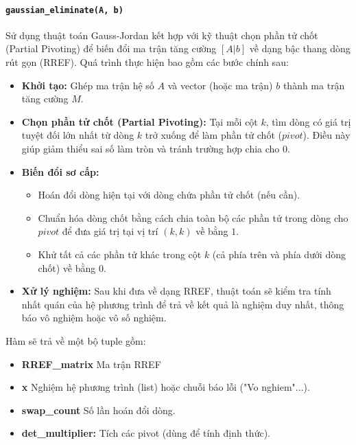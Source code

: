 \documentclass[12pt,a4paper]{article}
\begin{document}
\paragraph{\texttt{\textbf{gaussian\_eliminate(A, b)}}}
Sử dụng thuật toán Gauss-Jordan kết hợp với kỹ thuật chọn phần tử chốt (Partial Pivoting) để biến đổi ma trận tăng cường $[A | b]$ về dạng bậc thang dòng rút gọn (RREF). Quá trình thực hiện bao gồm các bước chính sau:
\begin{itemize}
\item \textbf{Khởi tạo:} Ghép ma trận hệ số $A$ và vector (hoặc ma trận) $b$ thành ma trận tăng cường $M$.

\item \textbf{Chọn phần tử chốt (Partial Pivoting):} Tại mỗi cột $k$, tìm dòng có giá trị tuyệt đối lớn nhất từ dòng $k$ trở xuống để làm phần tử chốt ($pivot$). Điều này giúp giảm thiểu sai số làm tròn và tránh trường hợp chia cho $0$.

\item \textbf{Biến đổi sơ cấp:}

    \begin{itemize}
    \item Hoán đổi dòng hiện tại với dòng chứa phần tử chốt (nếu cần).
    \item Chuẩn hóa dòng chốt bằng cách chia toàn bộ các phần tử trong dòng cho $pivot$ để đưa giá trị tại vị trí $(k, k)$ về bằng $1$.
    \item Khử tất cả các phần tử khác trong cột $k$ (cả phía trên và phía dưới dòng chốt) về bằng $0$.
    \end{itemize}
    
\item \textbf{Xử lý nghiệm:} Sau khi đưa về dạng RREF, thuật toán sẽ kiểm tra tính nhất quán của hệ phương trình để trả về kết quả là nghiệm duy nhất, thông báo vô nghiệm hoặc vô số nghiệm.\end{itemize}

Hàm sẽ trả về một bộ tuple gồm:
\begin{itemize}
\item \textbf{RREF\_matrix} Ma trận RREF
\item \textbf{x} Nghiệm hệ phương trình (list) hoặc chuỗi báo lỗi ("Vo nghiem"...).
\item \textbf{swap\_count} Số lần hoán đổi dòng.
\item \textbf{det\_multiplier:}  Tích các pivot (dùng để tính định thức).
\end{itemize}
\end{document}
